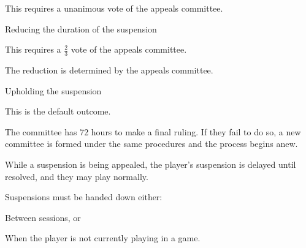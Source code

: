 \begin{deepEnumerate}
\begin{deepEnumerate}
\begin{deepEnumerate}
\begin{deepEnumerate}
                                          \item This requires a unanimous vote of the appeals committee.
                                    \end{deepEnumerate}
                              \item Reducing the duration of the suspension
                                    \begin{deepEnumerate}
                                          \item This requires a $\frac{2}{3}$ vote of the appeals committee.
                                          \item The reduction is determined by the appeals committee.
                                    \end{deepEnumerate}
                              \item Upholding the suspension
                                    \begin{deepEnumerate}
                                          \item This is the default outcome.
                                    \end{deepEnumerate}
                        \end{deepEnumerate}
                  \item The committee has 72 hours to make a final ruling.
                        If they fail to do so,
                        a new committee is formed under the same procedures and the process begins anew.
                  \item While a suspension is being appealed,
                        the player's suspension is delayed until resolved,
                        and they may play normally.
            \end{deepEnumerate}
      \item Suspensions must be handed down either:
            \begin{deepEnumerate}
                  \item Between sessions, or
                  \item When the player is not currently playing in a game.
            \end{deepEnumerate}
\end{deepEnumerate}

